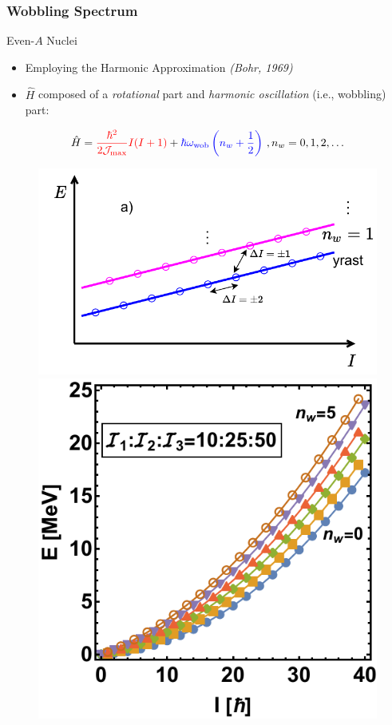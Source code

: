 \documentclass{beamer}
\begin{document}
\begin{frame}
  \frametitle{Wobbling Spectrum}
\begin{block}{Even-$A$ Nuclei}
  \begin{itemize}
    \item Employing the Harmonic Approximation \textit{(Bohr, 1969)}
    \item $\hat{H}$ composed of a {\color{red}\emph{rotational}} part and {\color{blue}\emph{harmonic oscillation}} (i.e., wobbling) part:
  \end{itemize}
  \begin{align}
    \hat{H}={\color{red}\frac{\hbar^2}{2\mathcal{J}_\text{max}}I(I+1)}+{\color{blue}\hbar\omega_\text{wob}\left(n_w+\frac{1}{2}\right)}\ , n_w=0,1,2,\dots
    \label{wobbling-hamiltonian-even-A}
  \end{align}
\end{block}
\begin{figure}
  \includegraphics[scale=0.5]{Figs/wobbling_n_schematic-1.pdf}
  \includegraphics[scale=0.4]{Figs/wobblingFreq-evenA.pdf}
\end{figure}
\end{frame}
\end{document}
